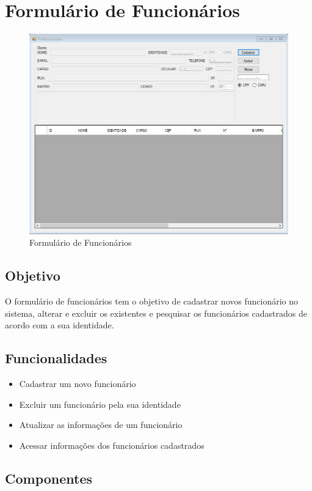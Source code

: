 \documentclass[
	article,			%
	12pt,				%
	oneside,			%
	a4paper,			%
	english,			%
	brazil,				%
	sumario=tradicional
	]{abntex2}
\begin{document}
	\section{Formulário de Funcionários}
		\begin{figure}[!htb]
			\centering
			\includegraphics[scale=0.6]{./Figuras/FrmFuncionario.png}
			\caption{Formulário de Funcionários}
		\end{figure}
		\subsection{Objetivo}
		O formulário de funcionários tem o objetivo de cadastrar novos funcionário no sistema, alterar e excluir os existentes e pesquisar os funcionários cadastrados de acordo com a sua identidade.
		\subsection{Funcionalidades}
			\begin{itemize}
				\item Cadastrar um novo funcionário
				\item Excluir um funcionário pela sua identidade
				\item Atualizar as informações de um funcionário
				\item Acessar informações dos funcionários cadastrados
			\end{itemize}
		\subsection{Componentes}
\end{document}
